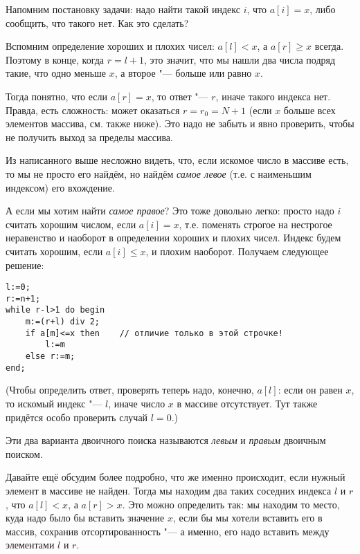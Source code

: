 Напомним постановку задачи: надо найти такой индекс $i$, что $a[i]=x$, либо сообщить,
что такого нет. Как это сделать?

Вспомним определение хороших и плохих чисел: $a[l]<x$, а $a[r]\geq x$ всегда.
Поэтому в конце, когда $r=l+1$, это значит, что мы нашли два числа подряд такие,
что одно меньше $x$, а второе "--- больше или равно $x$.

Тогда понятно, что если $a[r]=x$, то ответ "--- $r$, иначе такого индекса нет.
Правда, есть сложность: может оказаться $r=r_0=N+1$ (если $x$ больше всех элементов массива, см. также ниже). 
Это надо не забыть и явно проверить, чтобы не получить выход за пределы массива.

Из написанного выше несложно видеть, что, если искомое число в массиве есть, то мы не просто его найдём,
но найдём \textit{самое левое} (т.е. с наименьшим индексом) его вхождение.

А если мы хотим найти \textit{самое правое}? 
Это тоже довольно легко: просто надо $i$ считать хорошим числом, если $a[i]=x$, 
т.е. поменять строгое на нестрогое неравенство и наоборот в определении хороших и плохих чисел.
Индекс будем считать хорошим, если $a[i]\leq x$, и плохим наоборот. Получаем следующее решение:
\begin{codesampleo}\begin{verbatim}
l:=0;
r:=n+1;  
while r-l>1 do begin    
    m:=(r+l) div 2;
    if a[m]<=x then    // отличие только в этой строчке!
        l:=m
    else r:=m;
end;
\end{verbatim}
\end{codesampleo}
(Чтобы определить ответ, проверять теперь надо, конечно, $a[l]$: если он равен $x$, 
то искомый индекс "--- $l$,  иначе число $x$ в массиве отсутствует. Тут также придётся особо проверить случай $l=0$.)

Эти два варианта двоичного поиска называются \textit{левым} и \textit{правым} двоичным поиском.

Давайте ещё обсудим более подробно, что же именно происходит, если нужный элемент в массиве не найден.
Тогда мы находим два таких соседних индекса $l$ и $r$, что $a[l]<x$, а $a[r]>x$.
Это можно определить так: мы находим то место, куда надо было бы вставить значение $x$, 
если бы мы хотели вставить его в массив, сохранив отсортированность "--- а именно,
его надо вставить между элементами $l$ и $r$.

